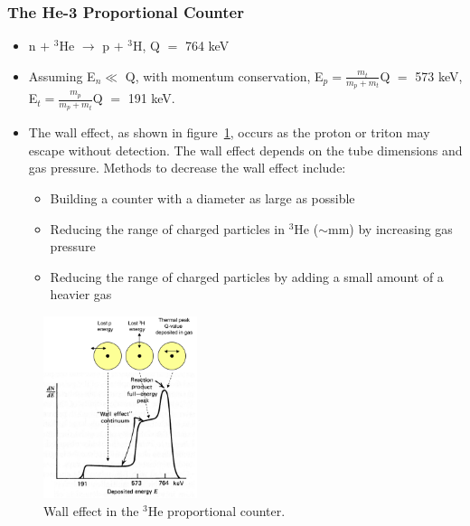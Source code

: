 \subsubsection{The He-3 Proportional Counter}
\begin{itemize}
    \item n $+$ $^3$He $\rightarrow$ p $+$ $^3$H, Q $=$ 764 keV
    \item Assuming E$_n\ll$ Q, with momentum conservation, E$_p=\frac{m_t}{m_p+m_t}$Q $=$ 573 keV, E$_t=\frac{m_p}{m_p+m_t}$Q $=$ 191 keV.
    \item The wall effect, as shown in figure~\ref{fig:He3_wall_effect}, occurs as the proton or triton may escape without detection. The wall effect depends on the tube dimensions and gas pressure. Methods to decrease the wall effect include:
    \begin{itemize}
        \item Building a counter with a diameter as large as possible
        \item Reducing the range of charged particles in $^3$He ($\sim$mm) by increasing gas pressure
        \item Reducing the range of charged particles by adding a small amount of a heavier gas
    \end{itemize} 
\end{itemize}
\begin{figure}[ht]
    \centering
    \includegraphics[width=0.4\textwidth]{images/He3_wall_effect.png}
    \caption{Wall effect in the $^3$He proportional counter.}
    \label{fig:He3_wall_effect}
\end{figure}
